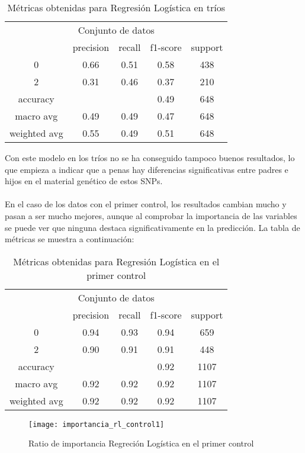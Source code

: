 \begin{table}[H]
  \centering
  \begin{tabular}{ccccc} \toprule
    \multicolumn{5}{c}{Conjunto de datos} \\ \cmidrule(r){1-5}
     & precision & recall & f1-score & support          \\ \midrule
    0 & 0.66 & 0.51 & 0.58 & 438          \\ 
    2 & 0.31 & 0.46 & 0.37 & 210          \\ 
    accuracy &  &  & 0.49 & 648          \\
    macro avg & 0.49 & 0.49 & 0.47 & 648          \\
    weighted avg & 0.55 & 0.49 & 0.51 & 648          \\ \bottomrule
  \end{tabular}
  \caption{Métricas obtenidas para Regresión Logística en tríos}
  \label{tb:info-datasets}
\end{table}
Con este modelo en los tríos no se ha conseguido tampoco buenos resultados, lo que empieza a indicar que a penas hay diferencias significativas entre padres e hijos en el material genético de estos SNPs.\\\\
En el caso de los datos con el primer control, los resultados cambian mucho y pasan a ser mucho mejores, aunque al comprobar la importancia de las variables se puede ver que ninguna destaca significativamente en la predicción. La tabla de métricas se muestra a continuación:

\begin{table}[H]
  \centering
  \begin{tabular}{ccccc} \toprule
    \multicolumn{5}{c}{Conjunto de datos} \\ \cmidrule(r){1-5}
     & precision & recall & f1-score & support          \\ \midrule
    0 & 0.94 & 0.93 & 0.94 & 659          \\ 
    2 & 0.90 & 0.91 & 0.91 & 448          \\ 
    accuracy &  &  & 0.92 & 1107          \\
    macro avg & 0.92 & 0.92 & 0.92 & 1107          \\
    weighted avg & 0.92 & 0.92 & 0.92 & 1107          \\ \bottomrule
  \end{tabular}
  \caption{Métricas obtenidas para Regresión Logística en el primer control}
  \label{tb:info-datasets}
\end{table}

\begin{figure}[H]
  \centering
  \texttt{[image: importancia\_rl\_control1]}
  \caption{Ratio de importancia Regreción Logística en el primer control}
  \label{fig:k-nn-example}
\end{figure}


\endinput
